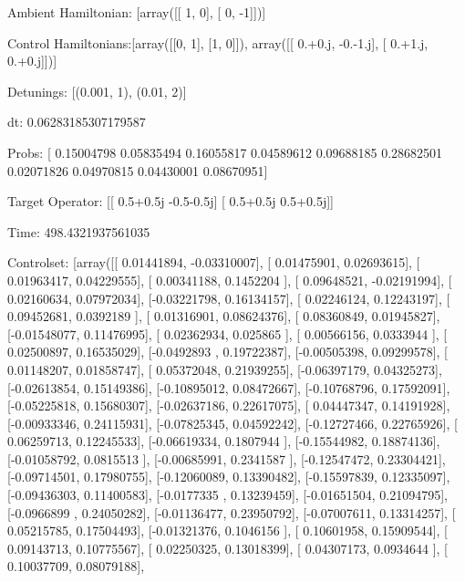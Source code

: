 \documentclass{article}
\begin{document}
    

\newpage

Ambient Hamiltonian: [array([[ 1,  0],
       [ 0, -1]])]

Control Hamiltonians:[array([[0, 1],
       [1, 0]]), array([[ 0.+0.j, -0.-1.j],
       [ 0.+1.j,  0.+0.j]])]

Detunings: [(0.001, 1), (0.01, 2)]

 dt: 0.06283185307179587

Probs: [ 0.15004798  0.05835494  0.16055817  0.04589612  0.09688185  0.28682501
  0.02071826  0.04970815  0.04430001  0.08670951]

Target Operator: [[ 0.5+0.5j -0.5-0.5j]
 [ 0.5+0.5j  0.5+0.5j]]

Time: 498.4321937561035

Controlset: [array([[ 0.01441894, -0.03310007],
       [ 0.01475901,  0.02693615],
       [ 0.01963417,  0.04229555],
       [ 0.00341188,  0.1452204 ],
       [ 0.09648521, -0.02191994],
       [ 0.02160634,  0.07972034],
       [-0.03221798,  0.16134157],
       [ 0.02246124,  0.12243197],
       [ 0.09452681,  0.0392189 ],
       [ 0.01316901,  0.08624376],
       [ 0.08360849,  0.01945827],
       [-0.01548077,  0.11476995],
       [ 0.02362934,  0.025865  ],
       [ 0.00566156,  0.0333944 ],
       [ 0.02500897,  0.16535029],
       [-0.0492893 ,  0.19722387],
       [-0.00505398,  0.09299578],
       [ 0.01148207,  0.01858747],
       [ 0.05372048,  0.21939255],
       [-0.06397179,  0.04325273],
       [-0.02613854,  0.15149386],
       [-0.10895012,  0.08472667],
       [-0.10768796,  0.17592091],
       [-0.05225818,  0.15680307],
       [-0.02637186,  0.22617075],
       [ 0.04447347,  0.14191928],
       [-0.00933346,  0.24115931],
       [-0.07825345,  0.04592242],
       [-0.12727466,  0.22765926],
       [ 0.06259713,  0.12245533],
       [-0.06619334,  0.1807944 ],
       [-0.15544982,  0.18874136],
       [-0.01058792,  0.0815513 ],
       [-0.00685991,  0.2341587 ],
       [-0.12547472,  0.23304421],
       [-0.09714501,  0.17980755],
       [-0.12060089,  0.13390482],
       [-0.15597839,  0.12335097],
       [-0.09436303,  0.11400583],
       [-0.0177335 ,  0.13239459],
       [-0.01651504,  0.21094795],
       [-0.0966899 ,  0.24050282],
       [-0.01136477,  0.23950792],
       [-0.07007611,  0.13314257],
       [ 0.05215785,  0.17504493],
       [-0.01321376,  0.1046156 ],
       [ 0.10601958,  0.15909544],
       [ 0.09143713,  0.10775567],
       [ 0.02250325,  0.13018399],
       [ 0.04307173,  0.0934644 ],
       [ 0.10037709,  0.08079188],
\end{document}
